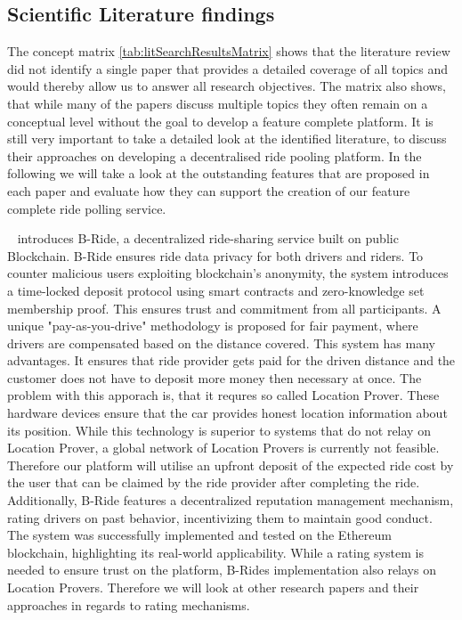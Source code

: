 \subsection{Scientific Literature findings}
The concept matrix \ref{tab:litSearchResultsMatrix} shows that the literature review did not identify a single paper that provides a detailed coverage of all topics and would thereby allow us to answer all research objectives. The matrix also shows, that while many of the papers discuss multiple topics they often remain on a conceptual level without the goal to develop a feature complete platform. It is still very important to take a detailed look at the identified literature, to discuss their approaches on developing a decentralised ride pooling platform. In the following we will take a look at the outstanding features that are proposed in each paper and evaluate how they can support the creation of our feature complete ride polling service.

~\cite{Baza.2021} introduces B-Ride, a decentralized ride-sharing service built on public Blockchain. B-Ride ensures ride data privacy for both drivers and riders. To counter malicious users exploiting blockchain's anonymity, the system introduces a time-locked deposit protocol using smart contracts and zero-knowledge set membership proof. This ensures trust and commitment from all participants. A unique "pay-as-you-drive" methodology is proposed for fair payment, where drivers are compensated based on the distance covered. This 
system has many advantages. It ensures that ride provider gets paid for the driven distance and the customer does not have to deposit more money then necessary at once. The problem with this apporach is, that it requres so called Location Prover. These hardware devices ensure that the car provides honest location information about its position. While this technology is superior to systems that do not relay on Location Prover, a global network of Location Provers is currently not feasible. Therefore our platform will utilise an upfront deposit of the expected ride cost by the user that can be claimed by the ride provider after completing the ride.
Additionally, B-Ride features a decentralized reputation management mechanism, rating drivers on past behavior, incentivizing them to maintain good conduct. The system was successfully implemented and tested on the Ethereum blockchain, highlighting its real-world applicability. While a rating system is needed to ensure trust on the platform, B-Rides implementation also relays on Location Provers. Therefore we will look at other research papers and their approaches in regards to rating mechanisms.

